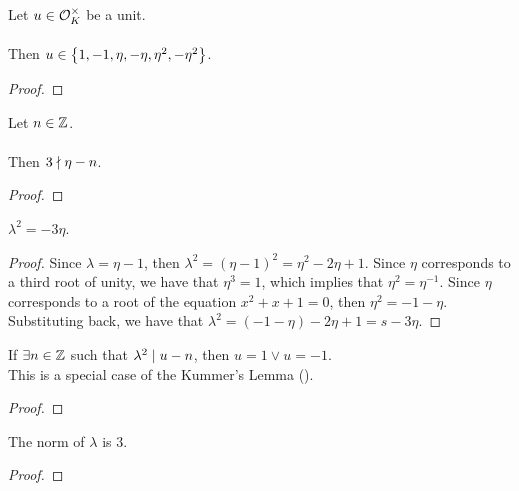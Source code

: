 \begin{theorem}
    \label{thm:mem}
    \leanok
    Let $u \in \mathcal{O}^\times_K$ be a unit. \\\\
    Then $u \in \left\{1, -1, \eta, -\eta, \eta^2, -\eta^2\right\}$.
\end{theorem}
\begin{proof}
    \leanok
\end{proof}

\begin{theorem}
    \label{thm:not_exists_int_three_dvd_sub}
    \leanok
    Let $n \in \mathbb{Z}$. \\\\
    Then $3 \nmid \eta - n$.
\end{theorem}
\begin{proof}
    \leanok
\end{proof}

\begin{lemma}
    \label{lmm:lambda_sq}
    \leanok
    $\lambda^2 = -3 \eta$.
\end{lemma}
\begin{proof}
    \leanok
    Since $\lambda = \eta -1$, then $\lambda^2 = (\eta - 1)^2 = \eta^2 - 2\eta + 1$.
    Since $\eta$ corresponds to a third root of unity, we have that $\eta^3 = 1$,
    which implies that $\eta^2 = \eta^{-1}$.
    Since $\eta$ corresponds to a root of the equation $x^2 + x + 1 = 0$, then $\eta^2 = -1 - \eta$.
    Substituting back, we have that $\lambda^2 = (-1 - \eta) - 2\eta + 1 = s-3\eta$.
\end{proof}

\begin{theorem}
    \label{lmm:eq_one_or_neg_one_of_unit_of_congruent}
    \leanok
    If $\exists n \in \mathbb{Z}$ such that $\lambda^2 \mid u - n$, then
    $u = 1 \lor u = -1$. \\
    This is a special case of the Kummer's Lemma ().
\end{theorem}
\begin{proof}
    \leanok
\end{proof}

\begin{lemma}
    \label{lmm:norm_lambda}
    \leanok
    The norm of $\lambda$ is $3$.
\end{lemma}
\begin{proof}
    \leanok
\end{proof}

